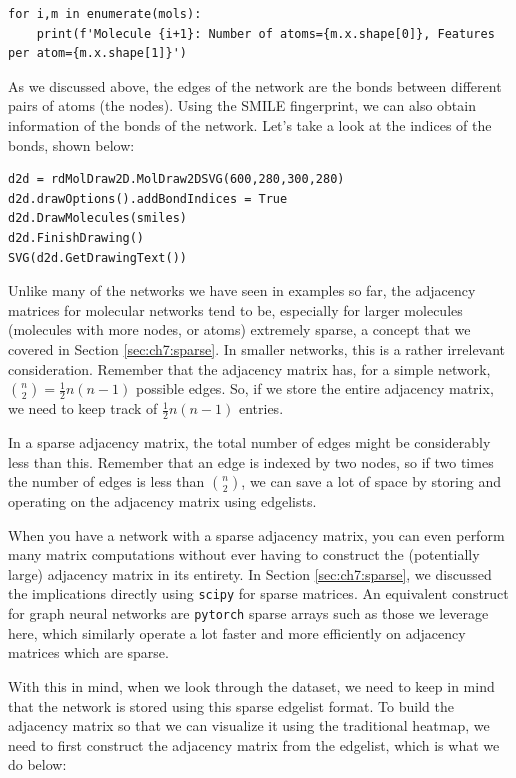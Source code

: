 \begin{lstlisting}[style=python]
for i,m in enumerate(mols):
    print(f'Molecule {i+1}: Number of atoms={m.x.shape[0]}, Features per atom={m.x.shape[1]}')
\end{lstlisting}

As we discussed above, the edges of the network are the bonds between different pairs of atoms (the nodes). Using the SMILE fingerprint, we can also obtain information of the bonds of the network. Let's take a look at the indices of the bonds, shown below:

\begin{lstlisting}[style=python]
d2d = rdMolDraw2D.MolDraw2DSVG(600,280,300,280)
d2d.drawOptions().addBondIndices = True
d2d.DrawMolecules(smiles)
d2d.FinishDrawing()
SVG(d2d.GetDrawingText())
\end{lstlisting}

Unlike many of the networks we have seen in examples so far, the adjacency matrices for molecular networks tend to be, especially for larger molecules (molecules with more nodes, or atoms) extremely sparse, a concept that we covered in Section \ref{sec:ch7:sparse}. In smaller networks, this is a rather irrelevant consideration. Remember that the adjacency matrix has, for a simple network, $\binom n 2 = \frac{1}{2}n(n - 1)$ possible edges. So, if we store the entire adjacency matrix, we need to keep track of $\frac{1}{2}n (n - 1)$ entries. 

In a sparse adjacency matrix, the total number of edges might be considerably less than this. Remember that an edge is indexed by two nodes, so if two times the number of edges is less than $\binom n 2$, we can save a lot of space by storing and operating on the adjacency matrix using edgelists.

When you have a network with a sparse adjacency matrix, you can even perform many matrix computations without ever having to construct the (potentially large) adjacency matrix in its entirety. In Section \ref{sec:ch7:sparse}, we discussed the implications directly using \texttt{scipy} for sparse matrices. An equivalent construct for graph neural networks are \texttt{pytorch} sparse arrays such as those we leverage here, which similarly operate a lot faster and more efficiently on adjacency matrices which are sparse.

With this in mind, when we look through the dataset, we need to keep in mind that the network is stored using this sparse edgelist format. To build the adjacency matrix so that we can visualize it using the traditional heatmap, we need to first construct the adjacency matrix from the edgelist, which is what we do below:

